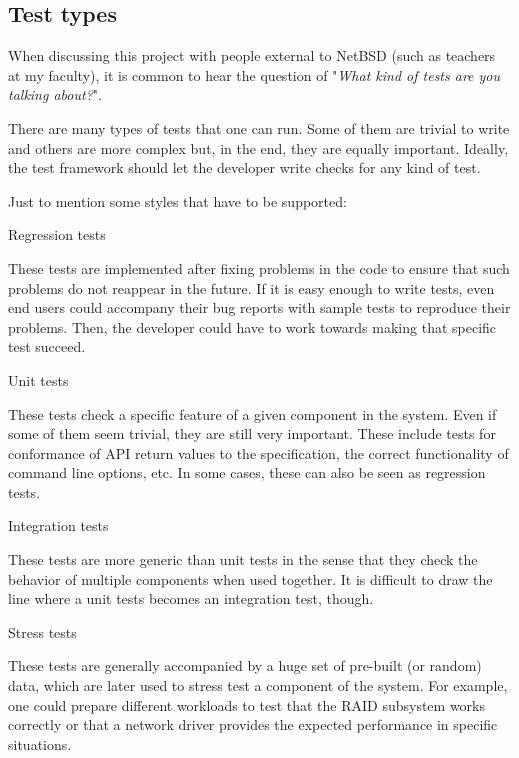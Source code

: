 \documentclass[a4paper,10pt]{article}
\begin{document}

\subsection{Test types}

When discussing this project with people external to NetBSD (such as
teachers at my faculty), it is common to hear the question of
"\emph{What kind of tests are you talking about?}".

There are many types of tests that one can run.  Some of them are trivial
to write and others are more complex but, in the end, they are equally
important.  Ideally, the test framework should let the developer write
checks for any kind of test.

Just to mention some styles that have to be supported:

\begin{description}

\item Regression tests

These tests are implemented after fixing problems in the code to ensure
that such problems do not reappear in the future.  If it is easy enough to
write tests, even end users could accompany their bug reports with sample
tests to reproduce their problems.  Then, the developer could have to work
towards making that specific test succeed.

\item Unit tests

These tests check a specific feature of a given component in the system.
Even if some of them seem trivial, they are still very important.  These
include tests for conformance of API return values to the specification,
the correct functionality of command line options, etc.  In some cases,
these can also be seen as regression tests.

\item Integration tests

These tests are more generic than unit tests in the sense that they check
the behavior of multiple components when used together.  It is difficult to
draw the line where a unit tests becomes an integration test, though.

\item Stress tests

These tests are generally accompanied by a huge set of pre-built (or random)
data, which are later used to stress test a component of the system.  For
example, one could prepare different workloads to test that the RAID
subsystem works correctly or that a network driver provides the expected
performance in specific situations.

\end{description}
\end{document}
